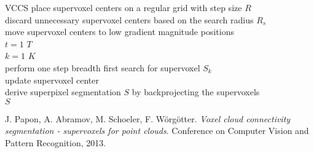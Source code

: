 \documentclass[12pt,a4paper]{article}
\begin{document}
	\begin{algorithm}[t]
	\begin{algo}{VCCS}{\label{algo:superpixel-segmentation-depth-vccs}}
		place supervoxel centers on a regular grid with step size $R$\\
		discard unnecessary supervoxel centers based on the search radius $R_s$\\		
		move supervoxel centers to low gradient magnitude positions\\
		\qfor $t = 1$ \qto $T$ \\
			\qfor $k = 1$ \qto $K$\\
				perform one step breadth first search for supervoxel $S_k$\\
				update supervoxel center\qrof\qrof\\
		derive superpixel segmentation $S$ by backprojecting the supervoxels\\
		\qreturn $S$
	\end{algo}
	\caption[The supervoxel algorithm \textbf{VCCS} \cite{PaponAbramovSchoelerWoergoetter}.]{\textbf{VCCS} uses $K$-means clustering based on breadth-first search beginning at the supervoxel centers to assign each voxel to a supervoxel. This way, \textbf{VCCS} ensures that the supervoxels represent connected components within the $26$-adjacency graph derived from the voxelized point cloud. The below algorithm can easily be adapted to return a supervoxel segmentation instead of a superpixel segmentation.}
	\label{fig:superpixel-segmentation-depth-vccs-breadth-first}
\end{algorithm}

	\begin{thebibliography}{1}
		J. Papon, A. Abramov, M. Schoeler, F. Wörgötter.
		\emph{Voxel cloud connectivity segmentation - supervoxels for point clouds}.
		Conference on Computer Vision and Pattern Recognition, 2013.
	\end{thebibliography}
\end{document}
